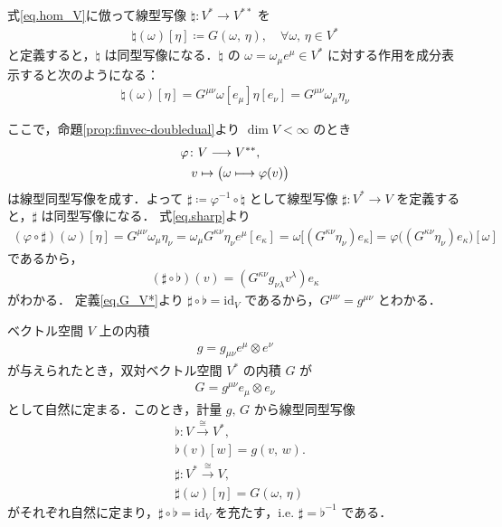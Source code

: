 \documentclass[geometry_main]{subfiles}
\begin{document}
式\eqref{eq.hom_V}に倣って線型写像 $\natural \colon V^* \to V^{**}$ を
\begin{align} 
	\natural(\omega)[\eta] \coloneqq G(\omega,\, \eta),\quad \forall \omega,\, \eta \in V^*
\end{align}
と定義すると，$\natural$ は同型写像になる．$\natural$ の $\omega = \omega_\mu e^\mu \in V^*$ に対する作用を成分表示すると次のようになる：
\begin{align} 
	\label{eq.sharp}
	\natural(\omega)[\eta] = G^{\mu\nu} \omega[e_\mu] \eta[e_\nu] = G^{\mu\nu} \omega_\mu \eta_\nu
\end{align}

ここで，命題\ref{prop:finvec-doubledual}より $\dim V < \infty$ のとき
\begin{align} 
	\varphi \colon &V \longrightarrow V^{**},\\ 
	v &\mapsto \bigl(\omega \longmapsto \varphi(v) \bigr)
\end{align}
は線型同型写像を成す．よって $\sharp \coloneqq \varphi^{-1} \circ \natural$ として線型写像 $\sharp \colon V^* \to V$ を定義すると，$\sharp$ は同型写像になる．
式\eqref{eq.sharp}より
\begin{align} 
	(\varphi \circ \sharp)(\omega)[\eta] = G^{\mu\nu} \omega_\mu \eta_\nu = \omega_\mu G^{\kappa\nu} \eta_\nu e^\mu[e_\kappa] = \omega \bigl[ (G^{\kappa\nu} \eta_\nu) e_\kappa \bigr] = \varphi \bigl( (G^{\kappa\nu} \eta_\nu) e_\kappa \bigr)[\omega]
\end{align}
であるから，
\begin{align} 
	(\sharp \circ \flat)(v) = (G^{\kappa\nu} g_{\nu\lambda} v^\lambda) e_\kappa
\end{align}
がわかる．
定義\eqref{eq.G_V*}より $\sharp \circ \flat = \mathrm{id}_V$ であるから，$G^{\mu\nu} = g^{\mu\nu}$ とわかる．

\begin{tcolorbox} 
	ベクトル空間 $V$ 上の内積
	\begin{align} 
		g = g_{\mu\nu} e^\mu \otimes e^\nu
	\end{align}
	が与えられたとき，双対ベクトル空間 $V^*$ の内積 $G$ が
	\begin{align} 
		G = g^{\mu\nu} e_\mu \otimes e_\nu
	\end{align}
	として自然に定まる．このとき，計量 $g,\, G$ から線型同型写像
	\begin{align} 
		&\flat \colon V \xrightarrow{\cong} V^*, \\
		&\flat(v)[w] = g(v,\, w). \\
		&\sharp \colon V^* \xrightarrow{\cong} V, \\
		&\sharp(\omega)[\eta] = G(\omega,\, \eta)
	\end{align}
	がそれぞれ自然に定まり，$\sharp \circ \flat = \mathrm{id}_V$ を充たす，i.e. $\sharp = \flat^{-1}$ である．
\end{tcolorbox}
\end{document}
